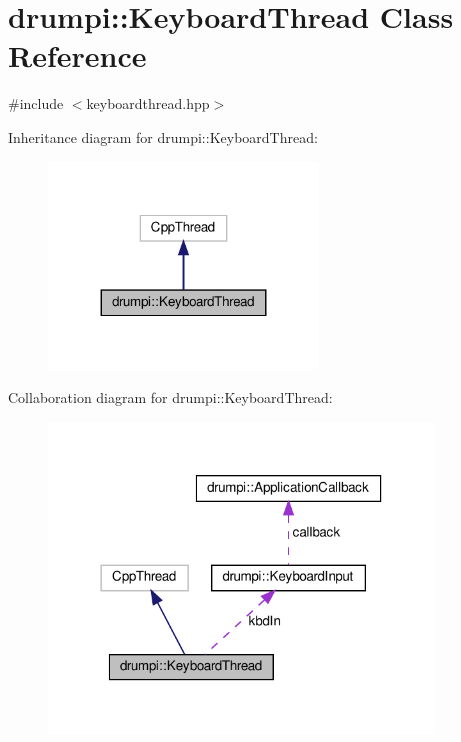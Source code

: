 \hypertarget{classdrumpi_1_1KeyboardThread}{}\section{drumpi\+:\+:Keyboard\+Thread Class Reference}
\label{classdrumpi_1_1KeyboardThread}


{\ttfamily \#include $<$keyboardthread.\+hpp$>$}



Inheritance diagram for drumpi\+:\+:Keyboard\+Thread\+:
\nopagebreak
\begin{figure}[H]
\begin{center}
\leavevmode
\includegraphics[width=203pt]{classdrumpi_1_1KeyboardThread__inherit__graph}
\end{center}
\end{figure}


Collaboration diagram for drumpi\+:\+:Keyboard\+Thread\+:
\nopagebreak
\begin{figure}[H]
\begin{center}
\leavevmode
\includegraphics[width=290pt]{classdrumpi_1_1KeyboardThread__coll__graph}
\end{center}
\end{figure}
